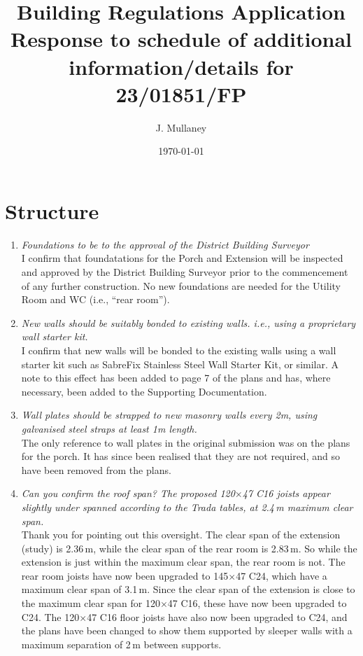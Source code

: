\documentclass{extension}
\begin{document}
\title{Building Regulations Application \\[2mm]
Response to schedule of additional \\ information/details for 23/01851/FP}
\author{J. Mullaney}
\date{\today}

\maketitle

\vspace{5mm}

\section{Structure}
\begin{enumerate}
\item {\it Foundations to be to the approval of the District Building Surveyor}\\
I confirm that foundatations for the Porch and Extension will be inspected and approved by the District Building Surveyor prior to the commencement of any further construction. No new foundations are needed for the Utility Room and WC (i.e., ``rear room'').
\item {\it New walls should be suitably bonded to existing walls. i.e., using a proprietary wall starter kit.}\\
I confirm that new walls will be bonded to the existing walls using a wall starter kit such as SabreFix Stainless Steel Wall Starter Kit, or similar.\cite{starterkit} A note to this effect has been added to page 7 of the plans and has, where necessary, been added to the Supporting Documentation.
\item {\it Wall plates should be strapped to new masonry walls every 2m, using galvanised steel straps at least 1m length.}\\
The only reference to wall plates in the original submission was on the plans for the porch. It has since been realised that they are not required, and so have been removed from the plans.
\item {\it Can you confirm the roof span? The proposed 120$\times$47 C16 joists appear slightly under spanned according to the Trada tables, at 2.4\,m maximum clear span.}\\
Thank you for pointing out this oversight. The clear span of the extension (study) is 2.36\,m, while the clear span of the rear room is 2.83\,m. So while the extension is just within the maximum clear span, the rear room is not. The rear room joists have now been upgraded to 145$\times$47 C24, which have a maximum clear span of 3.1\,m. Since the clear span of the extension is close to the maximum clear span for 120$\times$47 C16, these have now been upgraded to C24. The 120$\times$47 C16 floor joists have also now been upgraded to C24, and the plans have been changed to show them supported by sleeper walls with a maximum separation of 2\,m between supports.

\end{enumerate}
\end{document}
